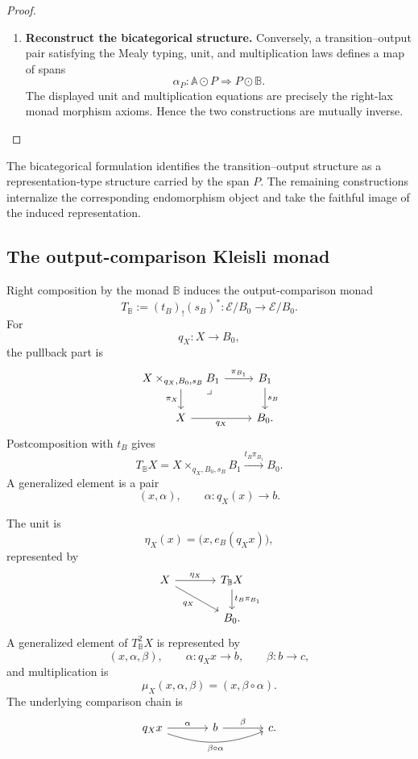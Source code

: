 \begin{proof}
\begin{enumerate}
        \item \textbf{Reconstruct the bicategorical structure.}
        Conversely, a transition--output pair satisfying the Mealy typing,
        unit, and multiplication laws defines a map of spans
        \[
            \alpha_P:
            \mathbb A\odot P
            \Longrightarrow
            P\odot\mathbb B.
        \]
        The displayed unit and multiplication equations are precisely the
        right-lax monad morphism axioms. Hence the two constructions are
        mutually inverse.
    \end{enumerate}
\end{proof}

\begin{remark}
\label{rem:to-bicategorical-role}
    The bicategorical formulation identifies the transition--output structure
    as a representation-type structure carried by the span \(P\). The
    remaining constructions internalize the corresponding endomorphism
    object and take the faithful image of the induced representation.
\end{remark}

\subsection{The output-comparison Kleisli monad}
\label{subsec:to-output-comparison-kleisli-monad}

Right composition by the monad \(\mathbb B\) induces the
output-comparison monad
\[
    T_{\mathbb B}
    :=
    (t_B)_!(s_B)^*:
    \mathcal E/B_0\to\mathcal E/B_0.
\]
For
\[
    q_X:X\to B_0,
\]
the pullback part is
\[
\begin{tikzcd}
    X\times_{q_X,B_0,s_B}B_1
        \arrow[r, "\pi_{B_1}"]
        \arrow[d, "\pi_X"']
        \arrow[dr, phantom, "\lrcorner", very near start]
    &
    B_1
        \arrow[d, "s_B"]
    \\
    X
        \arrow[r, "q_X"']
    &
    B_0.
\end{tikzcd}
\]
Postcomposition with \(t_B\) gives
\[
    T_{\mathbb B}X
    =
    X\times_{q_X,B_0,s_B}B_1
    \xrightarrow{t_B\pi_{B_1}}
    B_0.
\]
A generalized element is a pair
\[
    (x,\alpha),
    \qquad
    \alpha:q_X(x)\to b.
\]

The unit is
\[
    \eta_X(x)
    =
    \bigl(x,e_B(q_Xx)\bigr),
\]
represented by
\[
\begin{tikzcd}[column sep=large]
    X
        \arrow[r, "\eta_X"]
        \arrow[dr, "q_X"']
    &
    T_{\mathbb B}X
        \arrow[d, "t_B\pi_{B_1}"]
    \\
    &
    B_0.
\end{tikzcd}
\]
A generalized element of \(T_{\mathbb B}^2X\) is represented by
\[
    (x,\alpha,\beta),
    \qquad
    \alpha:q_Xx\to b,
    \qquad
    \beta:b\to c,
\]
and multiplication is
\[
    \mu_X(x,\alpha,\beta)
    =
    (x,\beta\circ\alpha).
\]
The underlying comparison chain is
\[
\begin{tikzcd}[column sep=large]
    q_Xx
        \arrow[r, "\alpha"]
        \arrow[rr, bend right=20, "\beta\circ\alpha"']
    &
    b
        \arrow[r, "\beta"]
    &
    c.
\end{tikzcd}
\]

